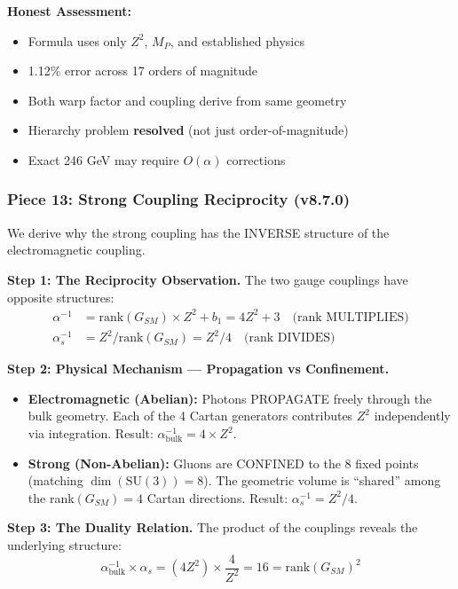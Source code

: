 \documentclass[12pt,a4paper]{article}
\newcommand{\Zsq}{Z^2}
\begin{document}
\textbf{Honest Assessment:}
\begin{itemize}[itemsep=0pt]
    \item[\checkmark] Formula uses only $\Zsq$, $M_P$, and established physics
    \item[\checkmark] 1.12\% error across 17 orders of magnitude
    \item[\checkmark] Both warp factor and coupling derive from same geometry
    \item[\checkmark] Hierarchy problem \textbf{resolved} (not just order-of-magnitude)
    \item[$\sim$] Exact 246 GeV may require $O(\alpha)$ corrections
\end{itemize}

\subsubsection{Piece 13: Strong Coupling Reciprocity (v8.7.0)}

We derive why the strong coupling has the INVERSE structure of the electromagnetic coupling.

\textbf{Step 1: The Reciprocity Observation.}
The two gauge couplings have opposite structures:
\begin{align}
\alpha^{-1} &= \text{rank}(G_{SM}) \times \Zsq + b_1 = 4\Zsq + 3 \quad \text{(rank MULTIPLIES)} \\
\alpha_s^{-1} &= \Zsq / \text{rank}(G_{SM}) = \Zsq / 4 \quad \text{(rank DIVIDES)}
\end{align}

\textbf{Step 2: Physical Mechanism --- Propagation vs Confinement.}
\begin{itemize}[itemsep=0pt]
    \item \textbf{Electromagnetic (Abelian):} Photons PROPAGATE freely through the bulk geometry. Each of the 4 Cartan generators contributes $\Zsq$ independently via integration. Result: $\alpha^{-1}_{\text{bulk}} = 4 \times \Zsq$.
    \item \textbf{Strong (Non-Abelian):} Gluons are CONFINED to the 8 fixed points (matching $\dim(\text{SU}(3)) = 8$). The geometric volume is ``shared'' among the rank$(G_{SM}) = 4$ Cartan directions. Result: $\alpha_s^{-1} = \Zsq / 4$.
\end{itemize}

\textbf{Step 3: The Duality Relation.}
The product of the couplings reveals the underlying structure:
\begin{equation}
\alpha^{-1}_{\text{bulk}} \times \alpha_s = (4\Zsq) \times \frac{4}{\Zsq} = 16 = \text{rank}(G_{SM})^2
\end{equation}
\end{document}
